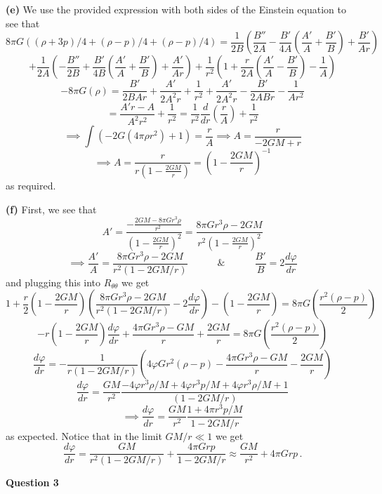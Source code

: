 \documentclass[10pt]{article}
\newcommand{\del}[2][]{\frac{d #1}{d #2}}
\begin{document}
\textbf{(e)} We use the provided expression with both sides of the Einstein equation to see that
\[ 8\pi G\left((\rho + 3p)/4 + (\rho - p)/4 + (\rho - p)/4\right) = \frac{1}{2B}\left(\frac{B''}{2A} - \frac{B'}{4A}\left(\frac{A'}{A} + \frac{B'}{B}\right) + \frac{B'}{Ar}\right) \]
\[ + \frac{1}{2A}\left(-\frac{B''}{2B} + \frac{B'}{4B}\left(\frac{A'}{A} + \frac{B'}{B}\right) + \frac{A'}{Ar}\right) + \frac{1}{r^{2}}\left(1 + \frac{r}{2A}\left(\frac{A'}{A} - \frac{B'}{B}\right) - \frac{1}{A}\right) \]
\[ -8\pi G(\rho) = \frac{B'}{2BAr} + \frac{A'}{2A^{2}r} + \frac{1}{r^{2}} + \frac{A'}{2A^{2}r} - \frac{B'}{2ABr} - \frac{1}{Ar^{2}} \]
\[ = \frac{A'r - A}{A^{2}r^{2}} + \frac{1}{r^{2}} = \frac{1}{r^{2}}\del{r}\left(\frac{r}{A}\right) + \frac{1}{r^{2}}\]
\[ \implies \int\left(-2G(4\pi\rho r^{2})  + 1\right) = \frac{r}{A} \implies A = \frac{r}{-2GM + r} \]
\[ \implies A = \frac{r}{r\left(1 - \frac{2GM}{r}\right)} = \left(1 - \frac{2GM}{r}\right)^{-1} \]
as required.

\textbf{(f)} First, we see that
\[ A' = \frac{-\frac{2GM - 8\pi Gr^{3} \rho}{r^{2}}}{\left(1 - \frac{2GM}{r}\right)^{2}}  =\frac{8\pi Gr^{3}\rho - 2GM}{r^{2}\left(1 - \frac{2GM}{r}\right)^{2}} \]
\[ \implies \frac{A'}{A} = \frac{8\pi Gr^{3}\rho - 2GM}{r^{2}\left(1 - 2GM/r\right)} \hspace{3em} \& \hspace{3em} \frac{B'}{B} = 2\del[\varphi]{r} \]
and plugging this into $R_{\theta\theta}$ we get
\[1 + \frac{r}{2}\left(1 - \frac{2GM}{r}\right)\left(\frac{8\pi Gr^{3}\rho - 2GM}{r^{2}\left(1 - 2GM/r\right)} - 2\del[\varphi]{r}\right) - \left(1 - \frac{2GM}{r}\right) = 8\pi G\left(\frac{r^{2}(\rho - p)}{2}\right) \]
\[ -r\left(1 - \frac{2GM}{r}\right)\del[\varphi]{r} + \frac{4\pi Gr^{3}\rho - GM}{r} + \frac{2GM}{r} = 8\pi G\left(\frac{r^{2}(\rho - p)}{2}\right)\]
\[ \del[\varphi]{r} = -\frac{1}{r\left(1 - 2GM/r\right)}\left(4\varphi Gr^{2}(\rho - p) -\frac{4\pi Gr^{3}\rho - GM}{r} - \frac{2GM}{r}\right) \]
\[ \del[\varphi]{r} = \frac{GM}{r^{2}}\frac{-4\varphi r^{3}\rho/M + 4\varphi r^{3}p/M + 4\varphi r^{3}\rho/M + 1}{(1 - 2GM/r)}\]
\[\implies \del[\varphi]{r} = \frac{GM}{r^{2}}\frac{1 + 4\pi r^{3}p/M}{1- 2GM/r} \]
as expected. Notice that in the limit $GM/r \ll  1$ we get
\[ \del[\varphi]{r} = \frac{GM}{r^{2}(1 - 2GM/r)} + \frac{4\pi Grp}{1 - 2GM/r} \approx \frac{GM}{r^{2}} + 4\pi Grp \, .\]

\newpage
\textbf{Question 3}
\end{document}
